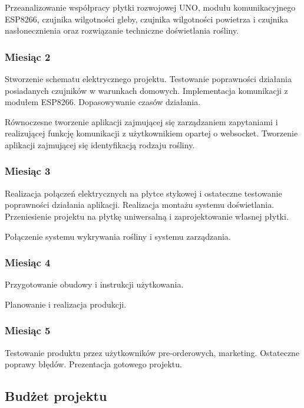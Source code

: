\documentclass[12pt]{article}
\begin{document}
Przeanalizowanie współpracy płytki rozwojowej UNO, modułu komunikacyjnego ESP8266, czujnika wilgotności gleby, czujnika wilgotności powietrza i czujnika nasłonecznienia oraz rozwiązanie techniczne doświetlania rośliny. 

\subsubsection{Miesiąc 2}

Stworzenie schematu elektrycznego projektu. Testowanie poprawności działania posiadanych czujników w warunkach domowych. Implementacja komunikacji z modułem ESP8266. Dopasowywanie czasów działania.

Równoczesne tworzenie aplikacji zajmującej się zarządzaniem zapytaniami i realizującej funkcję komunikacji z użytkownikiem opartej o websocket. Tworzenie aplikacji zajmującej się identyfikacją rodzaju rośliny.

\subsubsection{Miesiąc 3}
Realizacja połączeń elektrycznych na płytce stykowej i ostateczne testowanie poprawności działania aplikacji. Realizacja montażu systemu doświetlania. Przeniesienie projektu na płytkę uniwersalną i zaprojektowanie własnej płytki.

Połączenie systemu wykrywania rośliny i systemu zarządzania.


\subsubsection{Miesiąc 4}

Przygotowanie obudowy i instrukcji użytkowania. 

Planowanie i realizacja produkcji. 

\subsubsection{Miesiąc 5}
Testowanie produktu przez użytkowników pre-orderowych, marketing.
Ostateczne poprawy błędów.
Prezentacja gotowego projektu.





\subsection{Budżet projektu}
\end{document}
